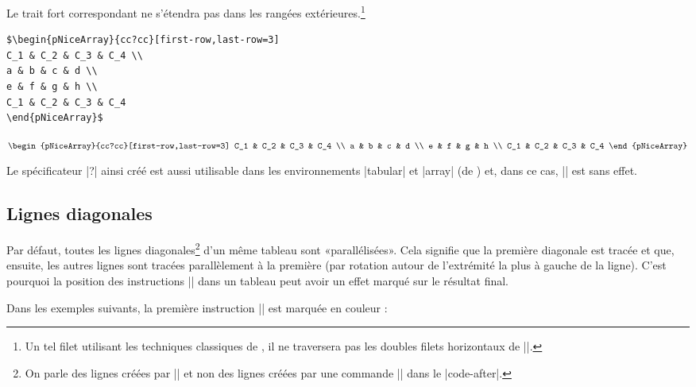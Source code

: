 \documentclass[dvipsnames]{article}%
\begin{document}
Le trait fort correspondant ne s'étendra pas dans les rangées
extérieures.\footnote{Un tel filet utilisant les techniques classiques de
  , il ne traversera pas les doubles filets horizontaux de |\hline\hline|.}

\medskip
\begin{scope}

\begin{BVerbatim}[baseline = c, boxwidth = 10.5cm]
$\begin{pNiceArray}{cc?cc}[first-row,last-row=3]
C_1 & C_2 & C_3 & C_4 \\
a & b & c & d \\
e & f & g & h \\
C_1 & C_2 & C_3 & C_4
\end{pNiceArray}$
\end{BVerbatim}
$\begin{pNiceArray}{cc?cc}[first-row,last-row=3]
C_1 & C_2 & C_3 & C_4 \\
a & b & c & d \\
e & f & g & h \\
C_1 & C_2 & C_3 & C_4
\end{pNiceArray}$
\end{scope}

\medskip
Le spécificateur |?| ainsi créé est aussi utilisable dans les environnements
|{tabular}| et |{array}| (de ) et, dans ce cas, |\OnlyMainNiceMatrix|
est sans effet.






\subsection{Lignes diagonales} 

Par défaut, toutes les lignes diagonales\footnote{On parle des lignes créées par
  |\Ddots| et non des lignes créées par une commande |\line| dans le
  |code-after|.} d'un même tableau sont «parallélisées». Cela signifie que la
première diagonale est tracée et que, ensuite, les autres lignes sont tracées
parallèlement à la première (par rotation autour de l'extrémité la plus à gauche
de la ligne). C'est pourquoi la position des instructions |\Ddots| dans un
tableau peut avoir un effet marqué sur le résultat final.

\medskip
Dans les exemples suivants, la première instruction |\Ddots| est marquée en couleur :
\end{document}
